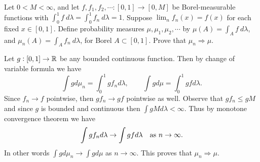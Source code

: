 \begin{problem}
	Let $ 0 < M < \infty $, and let $ f,f_1,f_2,\cdots: [0,1] \to [0,M] $ be Borel-measurable functions with $ \int_{0}^{1}f\ d\lambda = \int_{0}^{1} f_n\ d\lambda = 1 $. Suppose $ \lim_n f_n(x) = f(x) $ for each fixed $ x\in [0,1] $. Define probability  measures $ \mu,\mu_1,\mu_2,\cdots $ by $ \mu(A) = \int_{A} f\ d\lambda $, and $ \mu_n(A) = \int_A f_n\ d\lambda $, for Borel $ A \subset [0,1] $. Prove that $ \mu_n \Rightarrow \mu $.
\end{problem}
\begin{solution}
	Let $ g: [0,1]\to\mathbb{R} $ be any bounded continuous function. Then by change of variable formula we have
	\[ \int g d\mu_n = \int_0^1 g f_n d\lambda, \qquad \int g d\mu = \int_0^1 gf d\lambda. \]
	Since $ f_n \to f $ pointwise, then $ gf_n \to gf $ pointwise as well. Observe that $ gf_n \leq gM $ and since $ g $ is bounded and continuous then $ \int gM d\lambda < \infty $. Thus by monotone convergence theorem we have
	\[ \int {gf_n} {d\lambda} \to \int gf d\lambda \quad \text{as $ n\to\infty $}. \]
	In other words $ \int g d\mu_n \to \int g d\mu $ as $ n\to\infty $. This proves that $ \mu_n \Rightarrow \mu $.
\end{solution}




